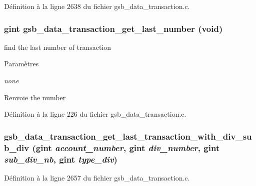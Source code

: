 Définition à la ligne 2638 du fichier gsb\_\-data\_\-transaction.c.

\subsubsection[{gsb\_\-data\_\-transaction\_\-get\_\-last\_\-number}]{\setlength{\rightskip}{0pt plus 5cm}gint gsb\_\-data\_\-transaction\_\-get\_\-last\_\-number (void)}\label{gsb__data__transaction_8h_ad5e10499d956a8613076bbd11fa8d376}
find the last number of transaction


\begin{DoxyParams}{Paramètres}
\item[{\em none}]\end{DoxyParams}
\begin{DoxyReturn}{Renvoie}
the number 
\end{DoxyReturn}


Définition à la ligne 226 du fichier gsb\_\-data\_\-transaction.c.

\subsubsection[{gsb\_\-data\_\-transaction\_\-get\_\-last\_\-transaction\_\-with\_\-div\_\-sub\_\-div}]{ gsb\_\-data\_\-transaction\_\-get\_\-last\_\-transaction\_\-with\_\-div\_\-sub\_\-div (gint {\em account\_\-number}, \/  gint {\em div\_\-number}, \/  gint {\em sub\_\-div\_\-nb}, \/  gint {\em type\_\-div})}\label{gsb__data__transaction_8h_a8fe058c05884ab1196d1b8b0286a1db9}


Définition à la ligne 2657 du fichier gsb\_\-data\_\-transaction.c.


